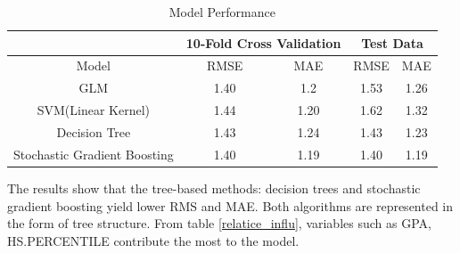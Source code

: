 \documentclass[12pt,english]{report}
\begin{document}
\begin{table}[h]
\centering
\caption{Model Performance}
\label{num_year}
\begin{tabular}{|c|c|c|c|c|}
\hline
                             & \multicolumn{2}{c|}{10-Fold Cross Validation} &
\multicolumn{2}{c|}{Test Data} \\ \hline
Model                        & RMSE                  & MAE                   &
RMSE           & MAE           \\ \hline
GLM                          & 1.40                  & 1.2                   &
1.53           & 1.26          \\ \hline
SVM(Linear Kernel)           & 1.44                  & 1.20                  &
1.62           & 1.32          \\ \hline
Decision Tree                         & 1.43                  & 1.24        &
1.43           & 1.23          \\ \hline
Stochastic Gradient Boosting & 1.40                  & 1.19                  &
1.40           & 1.19           \\ \hline
\end{tabular}
\end{table}


The results show that the tree-based methods: decision trees and stochastic
gradient boosting yield lower RMS and MAE. Both algorithms are represented in
the form of tree structure. From table \ref{relatice_influ}, variables such as
GPA, HS.PERCENTILE contribute the most to the model.
\end{document}

